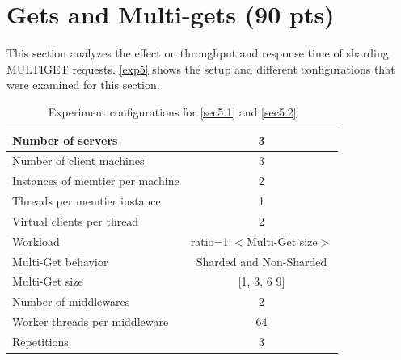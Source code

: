 \documentclass[11pt,a4paper]{article}
\begin{document}
\section{Gets and Multi-gets (90 pts)}
This section analyzes the effect on throughput and response time of sharding MULTIGET requests. \autoref{exp5} shows the setup and different configurations that were examined for this section.

\begin{center}
    \begin{table}[H]
        \centering
    	\begin{tabular}{|l|c|}
    		\hline Number of servers                & 3                            \\ 
    		\hline Number of client machines        & 3                            \\ 
    		\hline Instances of memtier per machine & 2                            \\ 
    		\hline Threads per memtier instance     & 1                            \\
    		\hline Virtual clients per thread       & 2                		       \\ 
    		\hline Workload                         & ratio=1:$<$Multi-Get size$>$ \\
    		\hline Multi-Get behavior               & Sharded and Non-Sharded      \\
    		\hline Multi-Get size                   & [1, 3, 6 9]                  \\
    		\hline Number of middlewares            & 2                            \\
    		\hline Worker threads per middleware    & 64                           \\
    		\hline Repetitions                      & 3                            \\ 
    		\hline 
    	\end{tabular}
    	\caption{Experiment configurations for \autoref{sec5.1} and \autoref{sec5.2}} 
    	\label{exp5}
    \end{table}
\end{center}
\end{document}
